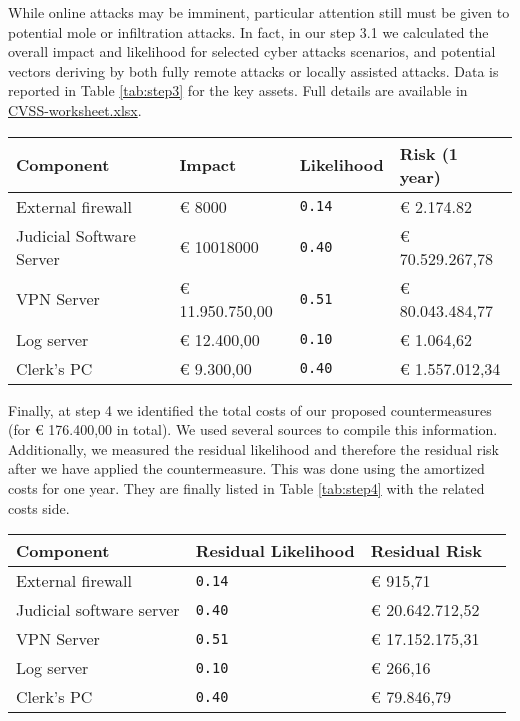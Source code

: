 While online attacks may be imminent, particular attention still must be given to potential mole or infiltration attacks\cite{online_2011}. In fact, in our step 3.1 we calculated the overall impact and likelihood for selected cyber attacks scenarios, and potential vectors deriving by both fully remote attacks or locally assisted attacks. Data is reported in Table \ref{tab:step3} for the key assets. Full details are available in \url{CVSS-worksheet.xlsx}. 

\begin{center}
    \label{tab:step3}
    \begin{tabular}{|l|l|l|l|}
    \hline
    Component & Impact & Likelihood & Risk (1 year)
    \\
    \hline
    External firewall     & € 8000      & \verb=0.14= & € 2.174.82    
    \\
    \hline
    Judicial Software Server     & € 10018000       & \verb=0.40=       &  € 70.529.267,78 
    \\
    \hline
    VPN Server     &  € 11.950.750,00        & \verb=0.51=       &  € 80.043.484,77 
    \\
    \hline
    Log server     &  € 12.400,00        & \verb=0.10=       &  € 1.064,62       \\
    \hline
    Clerk's PC     &  € 9.300,00        & \verb=0.40=       &  € 1.557.012,34 
    \\
    \hline
    \end{tabular}
\end{center}

Finally, at step 4 we identified the total costs of our proposed countermeasures (for € 176.400,00 in total). We used several sources to compile this information\cite{avfirewalls}\cite{basics_2020}\cite{limited}. Additionally, we measured the residual likelihood and therefore the residual risk after we have applied the countermeasure. This was done using the amortized costs for one year. They are finally listed in Table \ref{tab:step4} with the related costs side.

\begin{center}
    \label{tab:step4}
    \begin{tabular}{|l|l|l|l|}
    \hline
    Component & Residual Likelihood & Residual Risk \\
    \hline
    External firewall     & \verb=0.14=       &  € 915,71        \\
    \hline
    Judicial software server     & \verb=0.40=       &  € 20.642.712,52
    \\
    \hline
    VPN Server     & \verb=0.51=       & € 17.152.175,31
    \\
    \hline
    Log server     & \verb=0.10=       & € 266,16
    \\
    \hline
    Clerk's PC     & \verb=0.40=       & € 79.846,79
    \\
    \hline
    \end{tabular}
\end{center}

\clearpage
